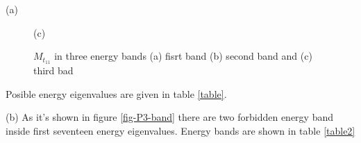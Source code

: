 \begin{homeworkProblem}
\begin{homeworkSection}{(a)}
\begin{figure}[!h]
\begin{minipage}[b]{1\linewidth}
\centerline{\small (c) }
\end{minipage}
\caption { $M_t_{11}$ in three energy bands (a) fisrt band (b) second band and (c) third bad}
\label{fig-energysolutions}
\end{figure}
 Posible energy eigenvalues are given in table \ref{table}.
\begin{table}[!h]\centering
\caption{Energy eigenvalues for three bands (eV)}
\label{table}
\end{table} 
 
\end{homeworkSection}

\begin{homeworkSection}{(b)}
As it's shown in figure \ref{fig-P3-band} there are two forbidden energy band inside first seventeen energy eigenvalues. Energy bands are shown in table \ref{table2}
 \begin{table}[!h]\centering
\caption{Energy bands (eV)}
\label{table2}
\end{table} 

\end{homeworkSection}


\end{homeworkProblem}
